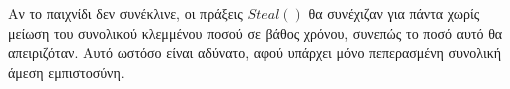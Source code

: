 \begin{proofsketch}
  Αν το παιχνίδι δεν συνέκλινε, οι πράξεις $Steal\left(\right)$ θα συνέχιζαν για πάντα χωρίς μείωση του συνολικού κλεμμένου
  ποσού σε βάθος χρόνου, συνεπώς το ποσό αυτό θα απειριζόταν. Αυτό ωστόσο είναι αδύνατο, αφού υπάρχει μόνο πεπερασμένη
  συνολική άμεση εμπιστοσύνη.
\end{proofsketch}
